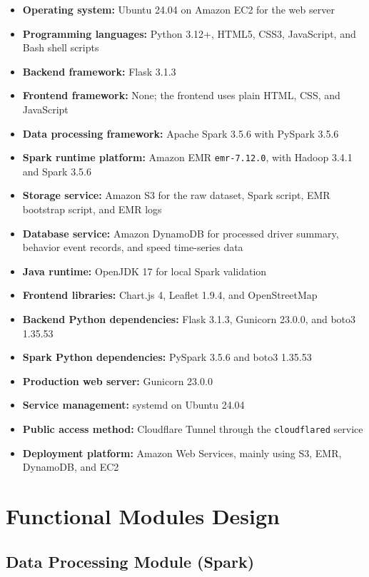 \documentclass[12pt,a4paper]{article}
\begin{document}
\begin{itemize}
    \item \textbf{Operating system:} Ubuntu 24.04 on Amazon EC2 for the web server
    \item \textbf{Programming languages:} Python 3.12+, HTML5, CSS3, JavaScript, and Bash shell scripts
    \item \textbf{Backend framework:} Flask 3.1.3
    \item \textbf{Frontend framework:} None; the frontend uses plain HTML, CSS, and JavaScript
    \item \textbf{Data processing framework:} Apache Spark 3.5.6 with PySpark 3.5.6
    \item \textbf{Spark runtime platform:} Amazon EMR \texttt{emr-7.12.0}, with Hadoop 3.4.1 and Spark 3.5.6
    \item \textbf{Storage service:} Amazon S3 for the raw dataset, Spark script, EMR bootstrap script, and EMR logs
    \item \textbf{Database service:} Amazon DynamoDB for processed driver summary, behavior event records, and speed time-series data
    \item \textbf{Java runtime:} OpenJDK 17 for local Spark validation
    \item \textbf{Frontend libraries:} Chart.js 4, Leaflet 1.9.4, and OpenStreetMap
    \item \textbf{Backend Python dependencies:} Flask 3.1.3, Gunicorn 23.0.0, and boto3 1.35.53
    \item \textbf{Spark Python dependencies:} PySpark 3.5.6 and boto3 1.35.53
    \item \textbf{Production web server:} Gunicorn 23.0.0
    \item \textbf{Service management:} systemd on Ubuntu 24.04
    \item \textbf{Public access method:} Cloudflare Tunnel through the \texttt{cloudflared} service
    \item \textbf{Deployment platform:} Amazon Web Services, mainly using S3, EMR, DynamoDB, and EC2
\end{itemize}


\section{Functional Modules Design}

\subsection{Data Processing Module (Spark)}
\end{document}
